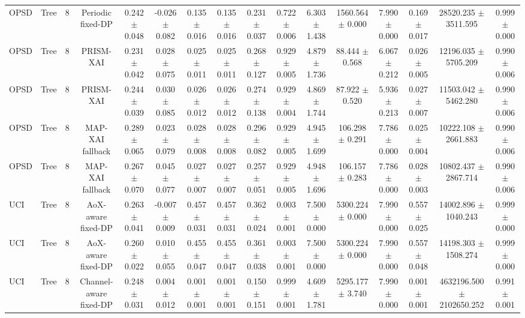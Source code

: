 \begin{tabular}{lccccccccccccccc}
OPSD & Tree & 8 & Periodic fixed-DP & 0.242 $\pm$ 0.048 & -0.026 $\pm$ 0.082 & 0.135 $\pm$ 0.016 & 0.135 $\pm$ 0.016 & 0.231 $\pm$ 0.037 & 0.722 $\pm$ 0.006 & 6.303 $\pm$ 1.438 & 1560.564 $\pm$ 0.000 & 7.990 $\pm$ 0.000 & 0.169 $\pm$ 0.017 & 28520.235 $\pm$ 3511.595 & 0.999 $\pm$ 0.000 \\
OPSD & Tree & 8 & PRISM-XAI & 0.231 $\pm$ 0.042 & 0.028 $\pm$ 0.075 & 0.025 $\pm$ 0.011 & 0.025 $\pm$ 0.011 & 0.268 $\pm$ 0.127 & 0.929 $\pm$ 0.005 & 4.879 $\pm$ 1.736 & 88.444 $\pm$ 0.568 & 6.067 $\pm$ 0.212 & 0.026 $\pm$ 0.005 & 12196.035 $\pm$ 5705.209 & 0.990 $\pm$ 0.006 \\
OPSD & Tree & 8 & PRISM-XAI & 0.244 $\pm$ 0.039 & 0.030 $\pm$ 0.085 & 0.026 $\pm$ 0.012 & 0.026 $\pm$ 0.012 & 0.274 $\pm$ 0.138 & 0.929 $\pm$ 0.004 & 4.869 $\pm$ 1.744 & 87.922 $\pm$ 0.520 & 5.936 $\pm$ 0.213 & 0.027 $\pm$ 0.007 & 11503.042 $\pm$ 5462.280 & 0.990 $\pm$ 0.006 \\
OPSD & Tree & 8 & MAP-XAI fallback & 0.289 $\pm$ 0.065 & 0.023 $\pm$ 0.079 & 0.028 $\pm$ 0.008 & 0.028 $\pm$ 0.008 & 0.296 $\pm$ 0.082 & 0.929 $\pm$ 0.005 & 4.945 $\pm$ 1.699 & 106.298 $\pm$ 0.291 & 7.786 $\pm$ 0.000 & 0.025 $\pm$ 0.004 & 10222.108 $\pm$ 2661.883 & 0.990 $\pm$ 0.006 \\
OPSD & Tree & 8 & MAP-XAI fallback & 0.267 $\pm$ 0.070 & 0.045 $\pm$ 0.077 & 0.027 $\pm$ 0.007 & 0.027 $\pm$ 0.007 & 0.257 $\pm$ 0.051 & 0.929 $\pm$ 0.005 & 4.948 $\pm$ 1.696 & 106.157 $\pm$ 0.283 & 7.786 $\pm$ 0.000 & 0.028 $\pm$ 0.003 & 10802.437 $\pm$ 2867.714 & 0.990 $\pm$ 0.006 \\
UCI & Tree & 8 & AoX-aware fixed-DP & 0.263 $\pm$ 0.041 & -0.007 $\pm$ 0.009 & 0.457 $\pm$ 0.031 & 0.457 $\pm$ 0.031 & 0.362 $\pm$ 0.024 & 0.003 $\pm$ 0.001 & 7.500 $\pm$ 0.000 & 5300.224 $\pm$ 0.000 & 7.990 $\pm$ 0.000 & 0.557 $\pm$ 0.025 & 14002.896 $\pm$ 1040.243 & 0.999 $\pm$ 0.000 \\
UCI & Tree & 8 & AoX-aware fixed-DP & 0.260 $\pm$ 0.022 & 0.010 $\pm$ 0.055 & 0.455 $\pm$ 0.047 & 0.455 $\pm$ 0.047 & 0.361 $\pm$ 0.038 & 0.003 $\pm$ 0.001 & 7.500 $\pm$ 0.000 & 5300.224 $\pm$ 0.000 & 7.990 $\pm$ 0.000 & 0.557 $\pm$ 0.048 & 14198.303 $\pm$ 1508.274 & 0.999 $\pm$ 0.000 \\
UCI & Tree & 8 & Channel-aware fixed-DP & 0.248 $\pm$ 0.031 & 0.004 $\pm$ 0.012 & 0.001 $\pm$ 0.001 & 0.001 $\pm$ 0.001 & 0.150 $\pm$ 0.151 & 0.999 $\pm$ 0.001 & 4.609 $\pm$ 1.781 & 5295.177 $\pm$ 3.740 & 7.990 $\pm$ 0.000 & 0.001 $\pm$ 0.001 & 4632196.500 $\pm$ 2102650.252 & 0.991 $\pm$ 0.001 \\

\end{tabular}
